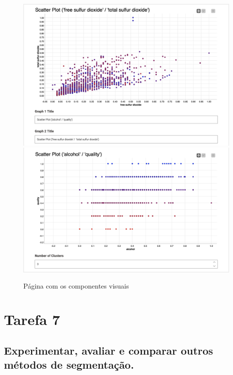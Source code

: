 \documentclass{article}
\begin{document}
\begin{figure}[H]
    \centering
    \includegraphics[scale=0.3]{Images/T6_a.png}
    \includegraphics[scale=0.3]{Images/T6_b.png}
    \caption{Página com os componentes visuais}
\end{figure}

\clearpage

\section{Tarefa 7}

\subsection{Experimentar, avaliar e comparar outros métodos de segmentação.}
\end{document}
